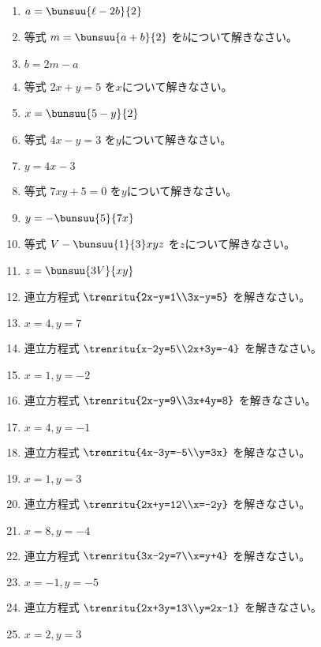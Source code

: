\documentclass[uplatex,a4j,11pt]{jsreport}
\begin{document}
\begin{multicols}{2}
\begin{enumerate}
    \item $a=\bunsuu{\ell-2b}{2}$
    \item 等式 $m=\bunsuu{a+b}{2}$ を$b$について解きなさい。%
    \item $b=2m-a$
    \item 等式 $2x+y=5$ を$x$について解きなさい。%
    \item $x=\bunsuu{5-y}{2}$
    \item 等式 $4x-y=3$ を$y$について解きなさい。%
    \item $y=4x-3$
    \item 等式 $7xy+5 = 0$ を$y$について解きなさい。%
    \item $y=-\bunsuu{5}{7x}$
    \item 等式 $V-\bunsuu{1}{3}xyz$ を$z$について解きなさい。%
    \item $z=\bunsuu{3V}{xy}$
    \item 連立方程式 $\trenritu{2x-y=1\\3x-y=5}$ を解きなさい。%
    \item $x=4, y=7$
    \item 連立方程式 $\trenritu{x-2y=5\\2x+3y=-4}$ を解きなさい。%
    \item $x=1, y=-2$
    \item 連立方程式 $\trenritu{2x-y=9\\3x+4y=8}$ を解きなさい。%
    \item $x=4, y=-1$
    \item 連立方程式 $\trenritu{4x-3y=-5\\y=3x}$ を解きなさい。%
    \item $x=1, y=3$
    \item 連立方程式 $\trenritu{2x+y=12\\x=-2y}$ を解きなさい。%
    \item $x=8, y=-4$
    \item 連立方程式 $\trenritu{3x-2y=7\\x=y+4}$ を解きなさい。%
    \item $x=-1, y=-5$
    \item 連立方程式 $\trenritu{2x+3y=13\\y=2x-1}$ を解きなさい。%
    \item $x=2, y=3$

\end{enumerate}
\end{multicols}
\end{document}
